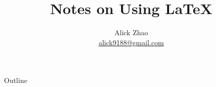 \documentclass[CJKchecksingle]{beamer}
\title[\LaTeX\ Notes]%
{Notes on Using \LaTeX}
\author[alick] %
{Alick Zhao\\%
\url{alick9188@gmail.com}}
\institute[NiuLab] %
{
NiuLab\\
Department of Electronic Engineering\\
Tsinghua University
}
\date %
{}
\begin{document}
\begin{frame}
\titlepage
\end{frame}

\begin{frame}{Outline}
\tableofcontents
\end{frame}




%
%
\end{document}
